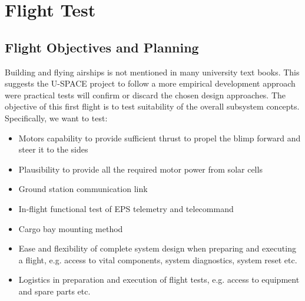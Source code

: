 \newpage
\chapter{Flight Test}
\label{chap:flight_test}

\section{Flight Objectives and Planning}
%
Building and flying airships is not mentioned in many university text books. This suggests the U-SPACE project to follow a more empirical development approach were practical tests will confirm or discard the chosen design approaches. The objective of this first flight is to test suitability of the overall subsystem concepts. Specifically, we want to test:

\begin{itemize}
\item Motors capability to provide sufficient thrust to propel the blimp forward and steer it to the sides
\item Plausibility to provide all the required motor power from solar cells
\item Ground station communication link
\item In-flight functional test of EPS telemetry and telecommand 
\item Cargo bay mounting method
\item Ease and flexibility of complete system design when preparing and executing a flight, e.g. access to vital components, system diagnostics, system reset etc.
\item Logistics in preparation and execution of flight tests, e.g. access to equipment and spare parts etc.
\end{itemize}
%
%

